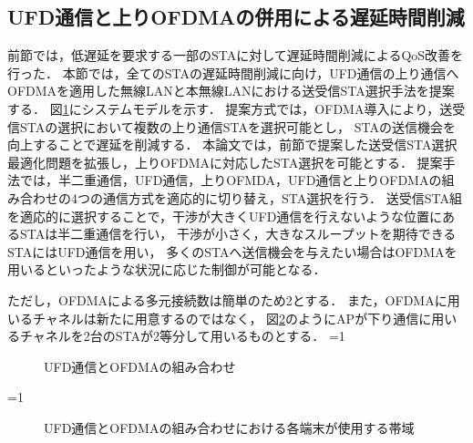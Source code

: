 \documentclass[master]{kuisthesis}		%
\newcounter{flagFig}
\begin{document}
		\subsection{UFD通信と上りOFDMAの併用による遅延時間削減}\label{sec:ufd_ofdma}
			前節では，低遅延を要求する一部のSTAに対して遅延時間削減によるQoS改善を行った．
			本節では，全てのSTAの遅延時間削減に向け，UFD通信の上り通信へOFDMAを適用した無線LANと本無線LANにおける送受信STA選択手法を提案する．
			図\ref{fig:ofdma}にシステムモデルを示す．
			提案方式では，OFDMA導入により，送受信STAの選択において複数の上り通信STAを選択可能とし，
			STAの送信機会を向上することで遅延を削減する．
			本論文では，前節で提案した送受信STA選択最適化問題を拡張し，上りOFDMAに対応したSTA選択を可能とする．
			提案手法では，半二重通信，UFD通信，上りOFMDA，UFD通信と上りOFDMAの組み合わせの4つの通信方式を適応的に切り替え，STA選択を行う．
			送受信STA組を適応的に選択することで，干渉が大きくUFD通信を行えないような位置にあるSTAは半二重通信を行い，
			干渉が小さく，大きなスループットを期待できるSTAにはUFD通信を用い，
			多くのSTAへ送信機会を与えたい場合はOFDMAを用いるといったような状況に応じた制御が可能となる．
			\par
			ただし，OFDMAによる多元接続数は簡単のため2とする．
			また，OFDMAに用いるチャネルは新たに用意するのではなく，
			図\ref{fig:ufd_ofdma_channel}のようにAPが下り通信に用いるチャネルを2台のSTAが2等分して用いるものとする．
			\ifnum\value{flagFig}=1 {\begin{figure}[t]
				\centering
				\caption{UFD通信とOFDMAの組み合わせ}
				\label{fig:ofdma}
			\end{figure}}\fi
			\ifnum\value{flagFig}=1 {\begin{figure}[t]
				\centering
				\caption{UFD通信とOFDMAの組み合わせにおける各端末が使用する帯域}
				\label{fig:ufd_ofdma_channel}
			\end{figure}}\fi
\end{document}
